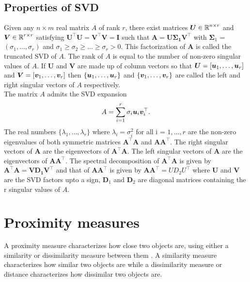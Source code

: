 \subsection{Properties of SVD}
Given any $n\times m$ real matrix $A$ of rank $r$, there exist matrices  $\bm{U} \in \operatorname{\mathbb{R}}^{n \times r}$ and $\bm{V} \in \operatorname{\mathbb{R}}^{r \times r}$ satisfying $\bm{U^{\top}U = V^{\top}V = I}$ such that $\bm{\text{A} = \text{U} \Sigma_{1} \text{V}^{\top}}$ with $\bm{\Sigma}_{1}$ = $(\sigma_{1}, \ldots, \sigma_{r})$ and $\sigma_{1} \geq \sigma_{2} \geq \ldots \geq \sigma_{r} > 0$.
This factorization of $\bm{A}$ is called the truncated SVD of $A$.
The rank of $A$ is equal to the number of non-zero singular values of $A$.
If $\bm{U}$ and $\bm{V}$ are made up of column vectors so that  $\bm{U} = [\boldsymbol{u}_1, \ldots, \boldsymbol{u}_{r}]$ and $\bm{V} = [\boldsymbol{v}_{1}, \ldots, \boldsymbol{v}_{r}]$ then $\{ \boldsymbol{u}_1, \ldots, \boldsymbol{u}_{r} \}$  and $\{\boldsymbol{v}_{1}, \ldots, \boldsymbol{v}_{r} \}$ are called the left and right singular vectors of $A$ respectively. \\
The matrix $A$ admits the SVD expansion 
\[
A = \sum_{i=1}^{r} \sigma_{i} \boldsymbol{u}_{i} \boldsymbol{v}_{i}^{\top}.
\]
The real numbers $\{\lambda_{1}, \ldots, \lambda_{r}\}$ where $\lambda_{i} = \sigma_{i}^{2}$ for all i = $1 , \ldots, r$ are the non-zero eigenvalues of both symmetric matrices $\bm{A^{\top}A}$ and $\bm{AA^{\top}}.$ The right singular vectors of $\bm{A}$ are the eigenvectors of $\bm{A^{\top}A}.$ The left singular vectors of $\bm{A}$ are the eigenvectors of $\bm{AA^{\top}}.$ The spectral decomposition of $\bm{A^{\top}A}$ is given by $\bm{A^{\top}A  = V D_{1} V^{\top}}$ and that of  $\bm{AA^{\top}}$ is given by  $\bm{AA^{\top}} = U D_{2} U^{\top}$ where $\bm{U}$ and $\bm{V}$ are the SVD factors upto a sign, $\bm{D}_{1}$ and $\bm{D}_{2}$ are diagonal matrices containing the r singular values of $A$.


\section{Proximity measures}\label{proximity}

\begin{Def}
A proximity measure characterizes how close two objects are, using
either a similarity or dissimilarity measure between them \cite{CoxT2000}.
A similarity measure characterizes how similar two objects are while
a dissimilarity measure or distance characterizes how dissimilar two objects are.
\end{Def}


